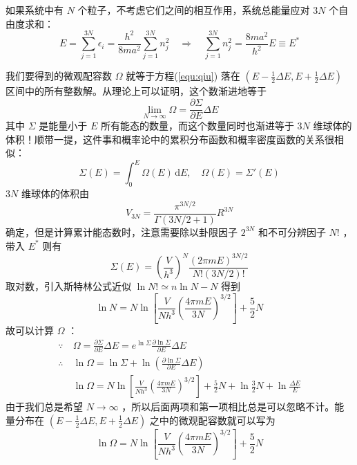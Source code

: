 \documentclass[hyperref,UTF-8]{ctexart}
\newcommand{\0}{\boldsymbol{0}}
\begin{document}
如果系统中有 $N$ 个粒子，不考虑它们之间的相互作用，系统总能量应对 $3N$ 个自由度求和：
\begin{equation}\label{equ:qiu}
    E = \sum_{j=1}^{3 N} \epsilon_i=\frac{ h^2}{8 m a^2} \sum_{j=1}^{3 N} n_j^2 \quad \Longrightarrow  \quad \sum_{j=1}^{3 N} n_j^2 = \frac{8ma^2}{h^2} E\equiv E^*
\end{equation}

我们要得到的微观配容数 $\Omega$ 就等于方程(\ref*{equ:qiu}) 落在 $(E-\frac{1}{2} \Delta E ,E+\frac{1}{2} \Delta E)$ 区间中的所有整数解。从理论上可以证明，这个数渐进地等于
\begin{equation}\label{equ:lim}
    \lim_{N\rightarrow \infty}\Omega = \frac{\partial \Sigma}{\partial E}\Delta E
\end{equation}
其中 $\Sigma$ 是能量小于 $E$ 所有能态的数量，而这个数量同时也渐进等于 $3N$ 维球体的体积！顺带一提，这件事和概率论中的累积分布函数和概率密度函数的关系很相似：
\[
    \Sigma(E) = \int_{0}^{E}\Omega(E)\,\mathrm dE,\quad \Omega(E) = \Sigma'(E)
\]
 $3N$ 维球体的体积由
\begin{equation}
    V_{3 N}=\frac{\pi^{3 N / 2}}{\Gamma(3 N / 2+1)} R^{3 N}
\end{equation}
确定，但是计算累计能态数时，注意需要除以卦限因子 $2^{3N}$ 和不可分辨因子 $N!$ ，带入 $E^*$ 则有
\begin{equation}
    \Sigma(E)= \left(\frac{V}{h^3} \right)^N \frac{(2\pi mE)^{3N/2}}{N!(3N/2)!} 
\end{equation}
取对数，引入斯特林公式近似 $\ln N! \simeq n\ln N - N$ 得到
\begin{equation}\label{equ:lnN}
    \ln N = N \ln\left[ \frac{V}{N h^3} \left(\frac{4\pi mE}{3N} \right)^{3/2}  \right] + \frac{5}{2} N
\end{equation}
故可以计算 $\Omega$ ：
\begin{align*}
    \because ~& \Omega = \frac{\partial \Sigma}{\partial E}\Delta E = e^{\ln \Sigma} \frac{\partial \ln\Sigma}{\partial E}\Delta E \\
    \therefore~& \ln \Omega = \ln \Sigma + \ln\left(\frac{\partial \ln\Sigma}{\partial E}\Delta E\right) \\
    ~& \ln \Omega = N \ln\left[ \frac{V}{N h^3} \left(\frac{4\pi mE}{3N} \right)^{3/2}  \right] + \frac{5}{2} N + \ln \frac{3}{2} N +\ln \frac{\Delta E}{E} 
\end{align*}
由于我们总是希望 $N\rightarrow \infty$ ，所以后面两项和第一项相比总是可以忽略不计。能量分布在 $(E-\frac{1}{2} \Delta E ,E+\frac{1}{2} \Delta E)$ 之中的微观配容数就可以写为
\begin{equation}
    \ln \Omega = N \ln\left[ \frac{V}{N h^3} \left(\frac{4\pi mE}{3N} \right)^{3/2}  \right] + \frac{5}{2} N 
\end{equation}
\end{document}
